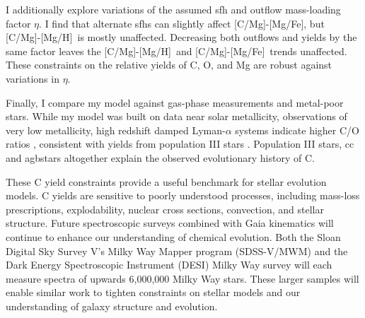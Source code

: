 \documentclass[12pt,oneside,letterpaper]{report}
\newcommand{\cc}{\gls{cc}}
\newcommand{\agb}{\gls{agb}}
\newcommand{\sfh}{\gls{sfh}}
\newcommand{\caah}{[C/Mg]-[Mg/H]}
\newcommand{\caafe}{[C/Mg]-[Mg/Fe]}
\begin{document}
I additionally explore variations of the assumed \sfh{} and outflow mass-loading factor $\eta$. I find that alternate \sfh{}s can slightly affect \caafe, but \caah~is mostly unaffected. Decreasing both outflows and yields by the same factor leaves the \caah~and \caafe~trends unaffected. These constraints on the relative yields of C, O, and Mg are robust against variations in $\eta$.

Finally, I compare my model against gas-phase measurements and metal-poor stars. While my model was built on data near solar metallicity, observations of very low metallicity, high redshift damped Lyman-$\alpha$ systems indicate higher C/O ratios \citep{cooke+17}, consistent with yields from population III stars \citep[e.g.][]{hirschi07}. Population III stars, \cc\, and \agb stars altogether explain the observed evolutionary history of C.

These C yield constraints provide a useful benchmark for stellar evolution models. C yields are sensitive to poorly understood processes, including mass-loss prescriptions, explodability, nuclear cross sections, convection, and stellar structure. Future spectroscopic surveys combined with Gaia kinematics \citep{gaia} will continue to enhance our understanding of chemical evolution. Both the Sloan Digital Sky Survey V's Milky Way Mapper program ({\sc SDSS-V/MWM}) \citep{sdssv} and the Dark Energy Spectroscopic Instrument ({\sc DESI}) Milky Way survey \citep{desi, desi:mw} will each measure spectra of upwards 6,000,000 Milky Way stars. These larger samples will enable similar work to tighten constraints on stellar models and our understanding of galaxy structure and evolution.



\newpage

 



\appendix
% 
\end{document}
